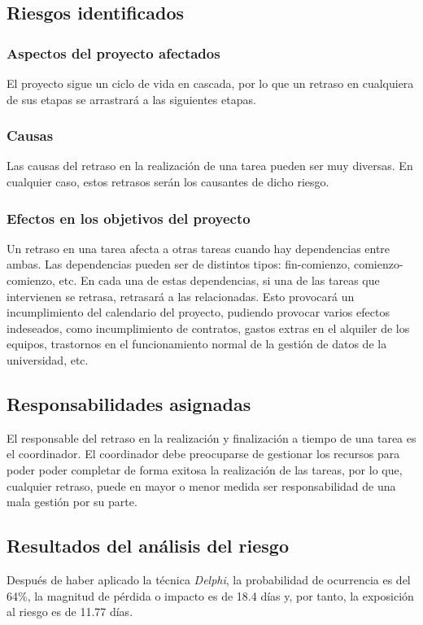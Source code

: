 \documentclass[11pt,a4paper,spanish,twoside]{report}
\begin{document}
\subsection{Riesgos identificados}
\subsubsection{Aspectos del proyecto afectados}
El proyecto sigue un ciclo de vida en cascada, por lo que un retraso en 
cualquiera de sus etapas se arrastrará a las siguientes etapas.

\subsubsection{Causas}
Las causas del retraso en la realización de una tarea pueden ser muy diversas.
En cualquier caso, estos retrasos serán los causantes de dicho riesgo.

\subsubsection{Efectos en los objetivos del proyecto}
Un retraso en una tarea afecta a otras tareas cuando hay dependencias entre
ambas. Las dependencias pueden ser de distintos tipos: fin-comienzo, 
comienzo-comienzo, etc. En cada una de estas dependencias, si una de las tareas
que intervienen se retrasa, retrasará a las relacionadas. Esto provocará un
incumplimiento del calendario del proyecto, pudiendo provocar varios efectos
indeseados, como incumplimiento de contratos, gastos extras en el alquiler de
los equipos, trastornos en el funcionamiento normal de la gestión de datos de
la universidad, etc.

\subsection{Responsabilidades asignadas}
El responsable del retraso en la realización y finalización a tiempo de una
tarea es el coordinador. El coordinador debe preocuparse de gestionar los
recursos para poder poder completar de forma exitosa la realización de las
tareas, por lo que, cualquier retraso, puede en mayor o menor medida ser
responsabilidad de una mala gestión por su parte.

\subsection{Resultados del análisis del riesgo}
Después de haber aplicado la técnica \emph{Delphi}, la probabilidad de
ocurrencia es del 64\%, la magnitud de pérdida o impacto es de 18.4 días y, por
tanto, la exposición al riesgo es de 11.77 días.
\end{document}
